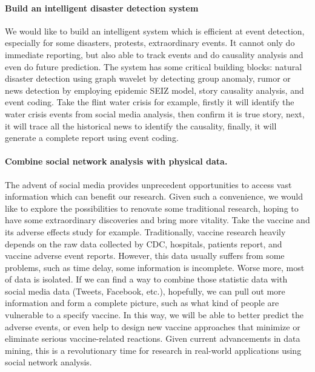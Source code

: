 \paragraph{Build an intelligent disaster detection system}
We would like to build an intelligent system which is efficient at event detection, especially for some disasters, protests, extraordinary events. It cannot only do immediate reporting, but also able to track events and do causality analysis and even do future prediction.
The system has some critical building blocks: natural disaster detection using graph wavelet by detecting group anomaly, rumor or news detection by employing epidemic SEIZ model, story causality analysis, and event coding.
Take the flint water crisis for example, firstly it will identify the water crisis events from social media analysis, then confirm it is true story, next, it will trace all the historical news to identify the causality, finally, it will generate a complete report using event coding.

\paragraph{Combine social network analysis with physical data.}
The advent of social media provides unprecedent opportunities to access vast information which can benefit our research. Given such a convenience, we would like to explore the possibilities to renovate some traditional research, hoping to have some extraordinary discoveries and bring more vitality. Take the vaccine and its adverse effects study for example. Traditionally, vaccine research heavily depends on the raw data collected by CDC, hospitals, patients report, and vaccine adverse event reports. However, this data usually suffers from some problems, such as time delay, some information is incomplete. Worse more, most of data is isolated. If we can find a way to combine those statistic data with social media data (Tweets, Facebook, etc.), hopefully, we can pull out more information and form a complete picture, such as what kind of people are vulnerable to a specify vaccine. In this way, we will be able to better predict the adverse events, or even help to design new vaccine approaches that minimize or eliminate serious vaccine-related reactions. Given current advancements in data mining, this is a revolutionary time for research in real-world applications using social network analysis.


